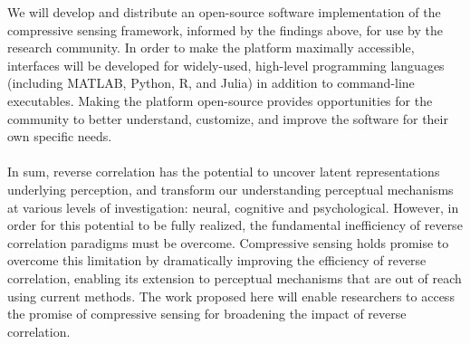 We will develop and distribute an open-source software implementation of the compressive sensing framework,
informed by the findings above, for use by the research community.
In order to make the platform maximally accessible, interfaces will be developed for widely-used, high-level programming languages
(including MATLAB, Python, R, and Julia) in addition to command-line executables.
Making the platform open-source provides opportunities for the community to better understand, customize, and improve the software for their own specific needs. \\ \\
\noindent
In sum, reverse correlation has the potential to uncover latent representations underlying
perception, and transform our understanding perceptual mechanisms at various levels of
investigation: neural, cognitive and psychological. However, in order for this potential to be fully
realized, the fundamental inefficiency of reverse correlation paradigms must be overcome.
Compressive sensing holds promise to overcome this limitation by dramatically improving the
efficiency of reverse correlation, enabling its extension to perceptual mechanisms that are out of
reach using current methods. The work proposed here will enable researchers to access the
promise of compressive sensing for broadening the impact of reverse correlation.



